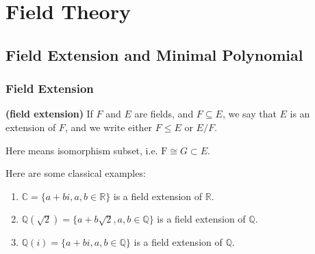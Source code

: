 \documentclass{article}
\newcommand{\bfs}[1]{\textbf{({#1}) }}
\begin{document}
\section{Field Theory}
\subsection{Field Extension and Minimal Polynomial}
\subsubsection{Field Extension}
\begin{defa}\bfs{field extension}
If $F$ and $E$ are fields, and $F \subseteq E$, we say that $E$ is an extension of $F$, and we write either $F \leq E$ or $E / F$.
\end{defa}
\begin{rema}
 Here means isomorphism subset, i.e. $\mathrm{F}\cong {G}\subset E$.
\end{rema}
\begin{exma}Here are some classical examples:
 \begin{enumerate}
     \item $\mathbb{C}=\{a+b i, a, b \in \mathbb{R}\}$ is a field extension of $\mathbb{R}$.
     \item $\mathbb{Q}(\sqrt{2})=\{a+b \sqrt{2}, a, b \in \mathbb{Q}\}$ is a field extension of $\mathbb{Q}$.
     \item $\mathbb{Q}(i)=\{a+b i, a, b \in \mathbb{Q}\}$ is a field extension of $\mathbb{Q}$.
 \end{enumerate}
\end{exma}
\end{document}
